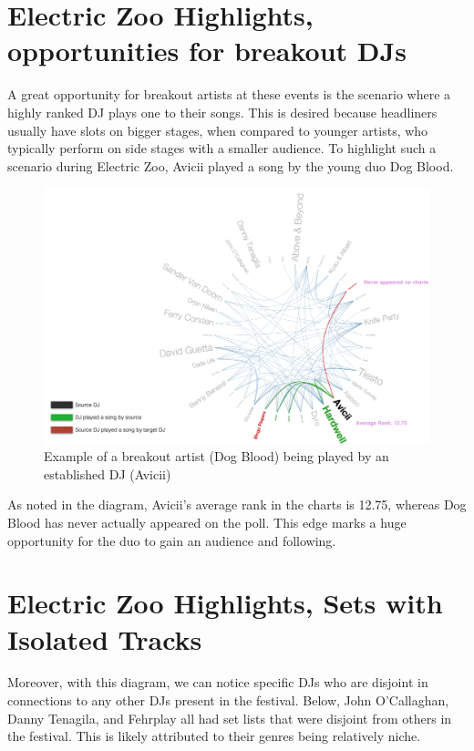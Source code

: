 \documentclass[12pt]{dalcsthesis}
\begin{document}
\section{Electric Zoo Highlights, opportunities for breakout DJs}

A great opportunity for breakout artists at these events is the scenario where a highly ranked DJ plays one to their songs. This is desired because headliners usually have slots on bigger stages, when compared to younger artists, who typically perform on side stages with a smaller audience. To highlight such a scenario during Electric Zoo, Avicii played a song by the young duo Dog Blood. \newpage

\begin{figure}[h]
\includegraphics[scale=.5]{avicii_dog_blood}
\centering
\caption{Example of a breakout artist (Dog Blood) being played by an established DJ (Avicii)}
\end{figure}

As noted in the diagram, Avicii's average rank in the charts is 12.75, whereas Dog Blood has never actually appeared on the poll. This edge marks a huge opportunity for the duo to gain an audience and following.

\section{Electric Zoo Highlights, Sets with Isolated Tracks}

Moreover, with this diagram, we can notice specific DJs who are disjoint in connections to any other DJs present in the festival. Below, John O'Callaghan, Danny Tenagila, and Fehrplay all had set lists that were disjoint from others in the festival. This is likely attributed to their genres being relatively niche. \newpage
\end{document}
